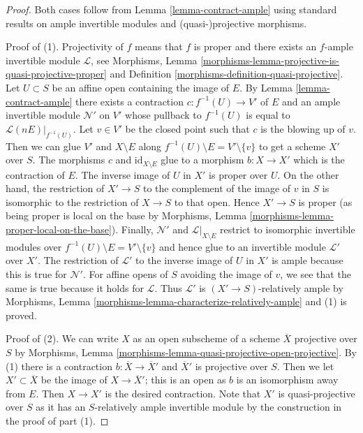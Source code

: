 \documentclass[10pt,a4paper]{amsart}
\theoremstyle{plain}
\theoremstyle{definition}
\theoremstyle{remark}
\numberwithin{equation}{subsection}
\begin{document}
\begin{proof}
Both cases follow from Lemma \ref{lemma-contract-ample}
using standard results on ample invertible modules and
(quasi-)projective morphisms.

\medskip\noindent
Proof of (1). Projectivity of $f$ means that $f$ is proper and there exists
an $f$-ample invertible module $\mathcal{L}$, see
Morphisms, Lemma \ref{morphisms-lemma-projective-is-quasi-projective-proper}
and Definition \ref{morphisms-definition-quasi-projective}.
Let $U \subset S$ be an affine open containing the image of $E$.
By Lemma \ref{lemma-contract-ample} there exists a contraction
$c : f^{-1}(U) \to V'$ of $E$ and an ample invertible module
$\mathcal{N}'$ on $V'$ whose pullback to $f^{-1}(U)$ is equal to
$\mathcal{L}(nE)|_{f^{-1}(U)}$. Let $v \in V'$ be the closed point
such that $c$ is the blowing up of $v$.
Then we can glue $V'$ and $X \setminus E$ along
$f^{-1}(U) \setminus E = V' \setminus \{v\}$
to get a scheme $X'$ over $S$. The morphisms $c$ and
$\text{id}_{X \setminus E}$ glue to a morphism $b : X \to X'$
which is the contraction of $E$. The inverse image of $U$ in $X'$
is proper over $U$. On the other hand, the restriction of $X' \to S$
to the complement of the image of $v$ in $S$ is isomorphic to the
restriction of $X \to S$ to that open. Hence $X' \to S$ is proper
(as being proper is local on the base by
Morphisms, Lemma \ref{morphisms-lemma-proper-local-on-the-base}).
Finally, $\mathcal{N}'$ and $\mathcal{L}|_{X \setminus E}$ restrict to
isomorphic invertible modules over $f^{-1}(U) \setminus E = V' \setminus \{v\}$
and hence glue to an invertible module $\mathcal{L}'$ over $X'$.
The restriction of $\mathcal{L}'$ to the inverse image of $U$
in $X'$ is ample because this is true for $\mathcal{N}'$.
For affine opens of $S$ avoiding the image of $v$, we see that
the same is true because it holds for $\mathcal{L}$.
Thus $\mathcal{L}'$ is $(X' \to S)$-relatively ample by
Morphisms, Lemma \ref{morphisms-lemma-characterize-relatively-ample}
and (1) is proved.

\medskip\noindent
Proof of (2). We can write $X$ as an open subscheme of a scheme
$\overline{X}$ projective over $S$ by Morphisms, Lemma
\ref{morphisms-lemma-quasi-projective-open-projective}.
By (1) there is a contraction $b : \overline{X} \to \overline{X}'$
and $\overline{X}'$ is projective over $S$. Then we let
$X' \subset \overline{X}$ be the image of $X \to \overline{X}'$;
this is an open as $b$ is an isomorphism away from $E$.
Then $X \to X'$ is the desired contraction. Note that
$X'$ is quasi-projective over $S$ as it has an
$S$-relatively ample invertible module
by the construction in the proof of part (1).
\end{proof}
\end{document}
